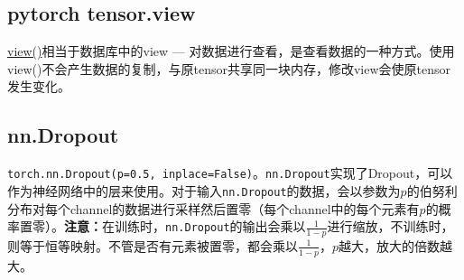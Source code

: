 \subsection{pytorch tensor.view}
\href{https://pytorch.org/docs/stable/tensor_view.html}{view()}相当于数据库中的view --- 对数据进行查看，是查看数据的一种方式。使用view()不会产生数据的复制，与原tensor共享同一块内存，修改view会使原tensor发生变化。

\subsection{nn.Dropout}
\texttt{torch.nn.Dropout(p=0.5, inplace=False)}。\texttt{nn.Dropout}实现了Dropout，可以作为神经网络中的层来使用。对于输入\texttt{nn.Dropout}的数据，会以参数为$p$的伯努利分布对每个channel的数据进行采样然后置零（每个channel中的每个元素有$p$的概率置零）。\textbf{注意：}在训练时，\texttt{nn.Dropout}的输出会乘以$\frac{1}{1 - p}$进行缩放，不训练时，则等于恒等映射。不管是否有元素被置零，都会乘以$\frac{1}{1 - p}$，$p$越大，放大的倍数越大。